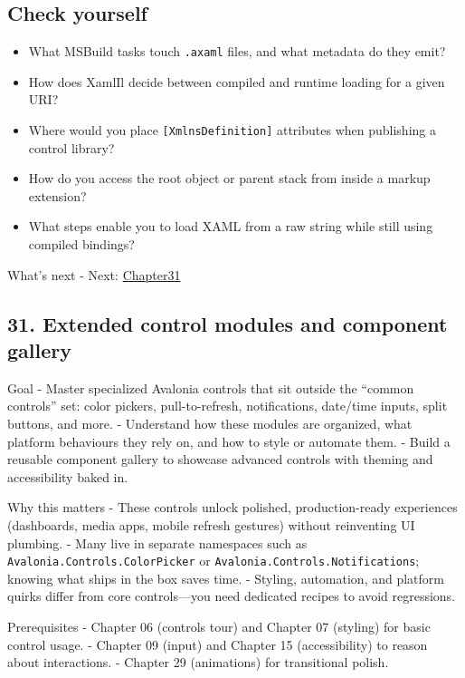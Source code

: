 \subsection{Check yourself}\label{check-yourself-28}

\begin{itemize}
\tightlist
\item
  What MSBuild tasks touch \passthrough{\lstinline!.axaml!} files, and
  what metadata do they emit?
\item
  How does XamlIl decide between compiled and runtime loading for a
  given URI?
\item
  Where would you place \passthrough{\lstinline![XmlnsDefinition]!}
  attributes when publishing a control library?
\item
  How do you access the root object or parent stack from inside a markup
  extension?
\item
  What steps enable you to load XAML from a raw string while still using
  compiled bindings?
\end{itemize}

What's next - Next: \href{Chapter31.md}{Chapter31}

\newpage

\subsection{31. Extended control modules and component
gallery}\label{extended-control-modules-and-component-gallery}

Goal - Master specialized Avalonia controls that sit outside the
``common controls'' set: color pickers, pull-to-refresh, notifications,
date/time inputs, split buttons, and more. - Understand how these
modules are organized, what platform behaviours they rely on, and how to
style or automate them. - Build a reusable component gallery to showcase
advanced controls with theming and accessibility baked in.

Why this matters - These controls unlock polished, production-ready
experiences (dashboards, media apps, mobile refresh gestures) without
reinventing UI plumbing. - Many live in separate namespaces such as
\passthrough{\lstinline!Avalonia.Controls.ColorPicker!} or
\passthrough{\lstinline!Avalonia.Controls.Notifications!}; knowing what
ships in the box saves time. - Styling, automation, and platform quirks
differ from core controls---you need dedicated recipes to avoid
regressions.

Prerequisites - Chapter 06 (controls tour) and Chapter 07 (styling) for
basic control usage. - Chapter 09 (input) and Chapter 15 (accessibility)
to reason about interactions. - Chapter 29 (animations) for transitional
polish.

